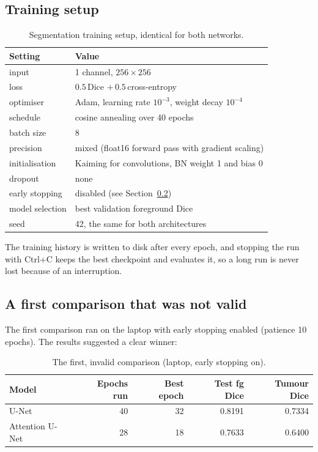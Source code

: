 \documentclass[11pt,a4paper]{article}
\begin{document}
\subsection{Training setup}

\begin{table}[H]
\centering\small
\begin{tabular}{ll}
\toprule
\textbf{Setting} & \textbf{Value} \\
\midrule
input & 1 channel, $256\times256$ \\
loss & $0.5\,$Dice $+\,0.5\,$cross-entropy \\
optimiser & Adam, learning rate $10^{-3}$, weight decay $10^{-4}$ \\
schedule & cosine annealing over 40 epochs \\
batch size & 8 \\
precision & mixed (float16 forward pass with gradient scaling) \\
initialisation & Kaiming for convolutions, BN weight 1 and bias 0 \\
dropout & none \\
early stopping & disabled (see Section~\ref{sec:seg_invalid}) \\
model selection & best validation foreground Dice \\
seed & 42, the same for both architectures \\
\bottomrule
\end{tabular}
\caption{Segmentation training setup, identical for both networks.}
\end{table}

The training history is written to disk after every epoch, and stopping the
run with Ctrl+C keeps the best checkpoint and evaluates it, so a long run is never
lost because of an interruption.

\subsection{A first comparison that was not valid}\label{sec:seg_invalid}

The first comparison ran on the laptop with early stopping enabled (patience 10
epochs). The results suggested a clear winner:

\begin{table}[H]
\centering\small
\begin{tabular}{lrrrr}
\toprule
\textbf{Model} & \textbf{Epochs run} & \textbf{Best epoch} & \textbf{Test fg Dice} & \textbf{Tumour Dice} \\
\midrule
U-Net           & 40 & 32 & 0.8191 & 0.7334 \\
Attention U-Net & 28 & 18 & 0.7633 & 0.6400 \\
\bottomrule
\end{tabular}
\caption{The first, invalid comparison (laptop, early stopping on).}
\end{table}
\end{document}
